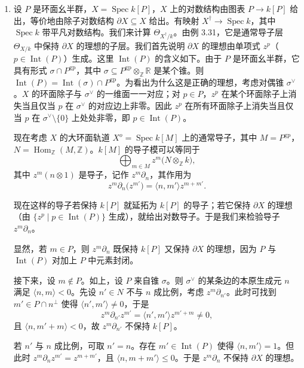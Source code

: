 \begin{examples}
\begin{enumerate}[label=(\arabic*),leftmargin=2.2em,itemsep=3pt]
\item 设 $P$ 是环面幺半群，$X=\operatorname{Spec} k[P]$，$X$ 上的对数结构由图表 $P\to k[P]$ 给出，等价地由除子对数结构 $\partial X\subseteq X$ 给出。有映射 $X^{\dagger}\to\operatorname{Spec} k$，其中 $\operatorname{Spec} k$ 带平凡对数结构。我们来计算 $\Theta_{X^{\dagger}/k}$。由例 3.31，它是通常导子层 $\Theta_{X/k}$ 中保持 $\partial X$ 的理想的子层。我们首先说明 $\partial X$ 的理想由单项式 $z^p$（$p\in\operatorname{Int}(P)$）生成。这里 $\operatorname{Int}(P)$ 的含义如下。由于 $P$ 是环面幺半群，它具有形式 $\sigma\cap P^{\mathrm{gp}}$，其中 $\sigma\subseteq P^{\mathrm{gp}}\otimes_{\mathbb{Z}}\mathbb{R}$ 是某个锥。则 $\operatorname{Int}(P)=\operatorname{Int}(\sigma)\cap P^{\mathrm{gp}}$。为看出为什么这是正确的理想，考虑对偶锥 $\sigma^{\vee}$。$X$ 的环面除子与 $\sigma^{\vee}$ 的一维面一一对应；对 $p\in P$，$z^p$ 在某个环面除子上消失当且仅当 $p$ 在 $\sigma^{\vee}$ 的对应边上非零。因此 $z^p$ 在所有环面除子上消失当且仅当 $p$ 在 $\sigma^{\vee}\setminus\{0\}$ 上处处非零，即 $p\in\operatorname{Int}(P)$。

现在考虑 $X$ 的大环面轨道 $X^o=\operatorname{Spec} k[M]$ 上的通常导子，其中 $M=P^{\mathrm{gp}}$，$N=\operatorname{Hom}_{\mathbb{Z}}(M,\mathbb{Z})$。$k[M]$ 的导子模可以等同于
\[
  \bigoplus_{m\in M} z^m\bigl(N\otimes_{\mathbb{Z}}k\bigr),
\]
其中 $z^m(n\otimes1)$ 是导子，记作 $z^m\partial_n$，其作用为
\[
  z^m\partial_n\bigl(z^{m'}\bigr)=\langle n,m'\rangle z^{m+m'}.
\]

现在这样的导子若保持 $k[P]$ 就延拓为 $k[P]$ 的导子；若它保持 $\partial X$ 的理想（由 $\{z^p\mid p\in\operatorname{Int}(P)\}$ 生成），就给出对数导子。于是我们来检验导子 $z^m\partial_n$。

显然，若 $m\in P$，则 $z^m\partial_n$ 既保持 $k[P]$ 又保持 $\partial X$ 的理想，因为 $P$ 与 $\operatorname{Int}(P)$ 对加上 $P$ 中元素封闭。

接下来，设 $m\notin P$。如上，设 $P$ 来自锥 $\sigma$。则 $\sigma^{\vee}$ 的某条边的本原生成元 $n$ 满足 $\langle n,m\rangle<0$。先设 $n'\in N$ 不与 $n$ 成比例，考虑 $z^m\partial_{n'}$。此时可找到 $m'\in P\cap n^{\perp}$ 使得 $\langle n',m'\rangle\neq0$，于是
\[
  z^m\partial_{n'}z^{m'}=\langle n',m'\rangle z^{m'+m}\neq0,
\]
且 $\langle n,m'+m\rangle<0$，故 $z^m\partial_{n'}$ 不保持 $k[P]$。

若 $n'$ 与 $n$ 成比例，可取 $n'=n$。存在 $m'\in\operatorname{Int}(P)$ 使得 $\langle n,m'\rangle=1$。但此时 $z^m\partial_n z^{m'}=z^{m+m'}$，且 $\langle n,m+m'\rangle\le0$。于是 $z^m\partial_n$ 不保持 $\partial X$ 的理想。


\end{enumerate}
\end{examples}
